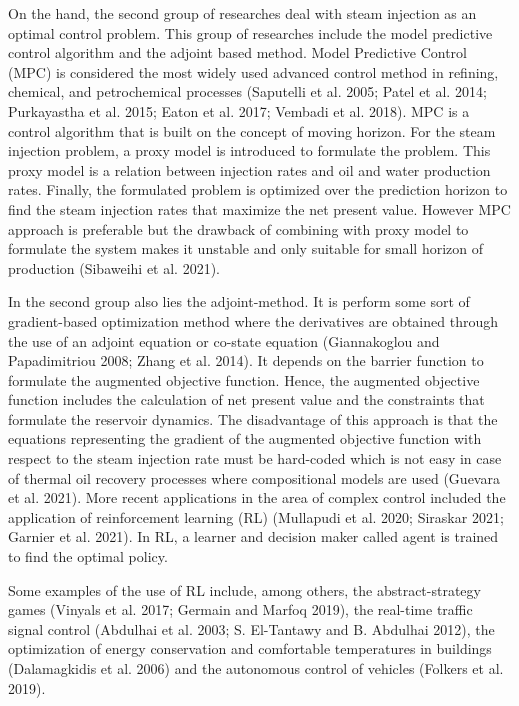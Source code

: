 On the hand, the second group of researches deal with steam injection as an optimal control problem. This group of researches include the model predictive control algorithm and the adjoint based method. Model Predictive Control (MPC) is considered the most widely used advanced control method in refining, chemical, and petrochemical processes (Saputelli et al. 2005; Patel et al. 2014; Purkayastha et al. 2015; Eaton et al. 2017; Vembadi et al. 2018). MPC is a control algorithm that is built on the concept of moving horizon. For the steam injection problem, a proxy model is introduced to formulate the problem. This proxy model is a relation between injection rates and oil and water production rates.  Finally, the formulated problem is optimized over the prediction horizon to find the steam injection rates that maximize the net present value. However MPC approach is preferable but the drawback of combining with proxy model to formulate the system makes it unstable and only suitable for small horizon of production (Sibaweihi et al. 2021). 

In the second group also lies the adjoint-method. It is perform some sort of gradient-based optimization method where the derivatives are obtained through the use of an adjoint equation or co-state equation (Giannakoglou and Papadimitriou 2008; Zhang et al. 2014). It depends on the barrier function to formulate the augmented objective function. Hence, the augmented objective function includes the calculation of net present value and the constraints that formulate the reservoir dynamics. The disadvantage of this approach is that the equations representing the gradient of the augmented objective function with respect to the steam injection rate must be hard-coded which is not easy in case of thermal oil recovery processes where compositional models are used (Guevara et al. 2021). 
More recent applications in the area of complex control included the application of reinforcement learning (RL) (Mullapudi et al. 2020; Siraskar 2021; Garnier et al. 2021). In RL, a learner and decision maker called agent is trained to find the optimal policy. 

Some examples of the use of RL include, among others, the abstract-strategy games (Vinyals et al. 2017; Germain and Marfoq 2019), the real-time traffic signal control (Abdulhai et al. 2003; S. El-Tantawy and B. Abdulhai 2012), the optimization of energy conservation and comfortable temperatures in buildings (Dalamagkidis et al. 2006) and the autonomous control of vehicles (Folkers et al. 2019). 


